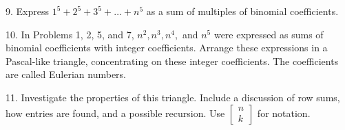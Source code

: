 \documentclass[10pt,]{book}
\theoremstyle{plain}
\theoremstyle{definition}
\theoremstyle{definition}
\theoremstyle{definition}
\numberwithin{equation}{chapter}
\begin{document}
\begin{exerciselist}
\item[9.]\hypertarget{exercise-43}{}\hypertarget{p-1796}{}%
Express \(1^{5} + 2^{5} + 3^{5} + \ldots + n^{5}\) as a sum of multiples of binomial coefficients.%
\par\smallskip
\item[10.]\hypertarget{exercise-44}{}\hypertarget{p-1797}{}%
In Problems 1, 2, 5, and 7, \(n^{2},n^{3},n^{4},\) and \(n^{5}\) were expressed as sums of binomial coefficients with integer coefficients. Arrange these expressions in a Pascal-like triangle, concentrating on these integer coefficients. The coefficients are called Eulerian numbers.%
\par\smallskip
\item[11.]\hypertarget{exercise-45}{}\hypertarget{p-1798}{}%
Investigate the properties of this triangle. Include a discussion of row sums, how entries are found, and a possible recursion. Use \(\begin{bmatrix}
n\\
k
\end{bmatrix}\) for notation.%
\par\smallskip
\end{exerciselist}
\typeout{************************************************}
\typeout{************************************************}
\end{document}
